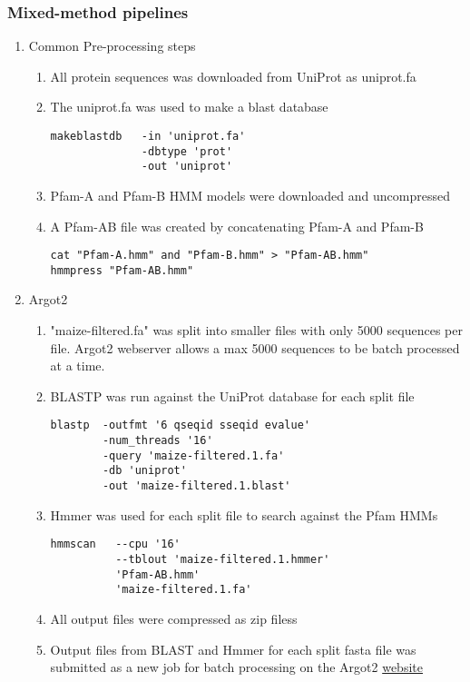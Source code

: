   \subsubsection{Mixed-method pipelines}
  \begin{enumerate}
    \item Common Pre-processing steps
    \begin{enumerate}
      \item All protein sequences was downloaded from UniProt as uniprot.fa
      \item The uniprot.fa was used to make a blast database
      \begin{verbatim}
makeblastdb   -in 'uniprot.fa'
              -dbtype 'prot'
              -out 'uniprot'
      \end{verbatim}
      \item Pfam-A and Pfam-B HMM models were downloaded and uncompressed
      \item A Pfam-AB file was created by concatenating Pfam-A and Pfam-B
      \begin{verbatim}
cat "Pfam-A.hmm" and "Pfam-B.hmm" > "Pfam-AB.hmm"
hmmpress "Pfam-AB.hmm"
      \end{verbatim}
    \end{enumerate}
    \item Argot2
    \begin{enumerate}
      \item "maize-filtered.fa" was split into smaller files with only 5000 sequences per file. Argot2 webserver allows a max 5000 sequences to be batch processed at a time.
      \item BLASTP was run against the UniProt database for each split file
       \begin{verbatim}
blastp  -outfmt '6 qseqid sseqid evalue'
        -num_threads '16'
        -query 'maize-filtered.1.fa'
        -db 'uniprot'
        -out 'maize-filtered.1.blast'
       \end{verbatim}
       \item Hmmer was used for each split file to search against the Pfam HMMs
       \begin{verbatim}
hmmscan   --cpu '16'
          --tblout 'maize-filtered.1.hmmer'
          'Pfam-AB.hmm'
          'maize-filtered.1.fa'
       \end{verbatim}
       \item All output files were compressed as zip filess
       \item Output files from BLAST and Hmmer for each split fasta file was submitted as a new job for batch processing on the Argot2  \href{http://www.medcomp.medicina.unipd.it/Argot2/form_batch.php }{website}

\end{enumerate}
\end{enumerate}
